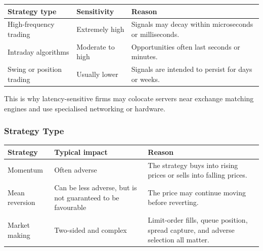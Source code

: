 \documentclass[12pt,openany]{book}
\theoremstyle{definition}
\theoremstyle{remark}
\begin{document}
\begin{center}
\small
\begin{tabular}{|L{0.25\textwidth}|L{0.22\textwidth}|L{0.39\textwidth}|}
\hline
\textbf{Strategy type} & \textbf{Sensitivity} & \textbf{Reason} \\ \hline
High-frequency trading & Extremely high & Signals may decay within microseconds or milliseconds. \\ \hline
Intraday algorithms & Moderate to high & Opportunities often last seconds or minutes. \\ \hline
Swing or position trading & Usually lower & Signals are intended to persist for days or weeks. \\ \hline
\end{tabular}
\end{center}

This is why latency-sensitive firms may colocate servers near exchange
matching engines and use specialised networking or hardware.

\subsubsection{Strategy Type}

\begin{center}
\small
\begin{tabular}{|L{0.24\textwidth}|L{0.22\textwidth}|L{0.41\textwidth}|}
\hline
\textbf{Strategy} & \textbf{Typical impact} & \textbf{Reason} \\ \hline
Momentum & Often adverse & The strategy buys into rising prices or sells into falling prices. \\ \hline
Mean reversion & Can be less adverse, but is not guaranteed to be favourable &
The price may continue moving before reverting. \\ \hline
Market making & Two-sided and complex & Limit-order fills, queue position, spread capture, and adverse selection all matter. \\ \hline
\end{tabular}
\end{center}
\end{document}
